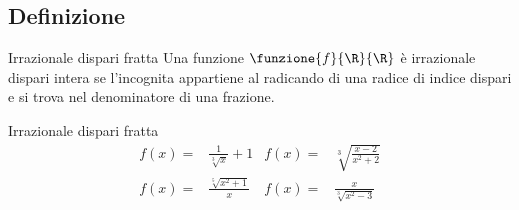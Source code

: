 \subsection{Definizione}
\begin{definizionet}{Irrazionale dispari fratta}{}
	Una funzione $\funzione{f}{\R}{\R}$ è irrazionale dispari intera se l'incognita appartiene al radicando di una radice di indice dispari e   si trova nel denominatore di una frazione. 
\end{definizionet}
\begin{esempiot}{Irrazionale dispari fratta}{}
	\begin{align*}
	f(x)=&\frac{1}{\sqrt[3]{x}}+1&f(x)=&\sqrt[3]{\frac{x-2}{x^2+2}}\\
	f(x)=&\frac{\sqrt[5]{x^2+1}}{x}&f(x)=&\frac{x}{\sqrt[3]{x^2-3}}\\
	\end{align*}
\end{esempiot}
